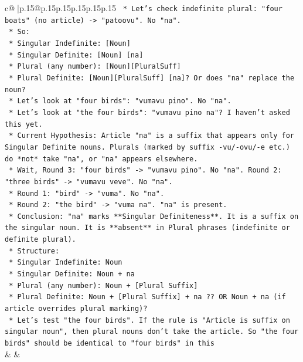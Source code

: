 \documentclass{article}
\begin{document}
{\begin{supertabular}{c@{$\;$}|p{.15\linewidth}@{}p{.15\linewidth}p{.15\linewidth}p{.15\linewidth}p{.15\linewidth}p{.15\linewidth}}
{{{\texttt{        *   Let's check indefinite plural: "four boats" (no article) {-}> "patoovu". No "na".} \\
\texttt{        *   So:} \\
\texttt{            *   Singular Indefinite: {[}Noun{]}} \\
\texttt{            *   Singular Definite: {[}Noun{]} {[}na{]}} \\
\texttt{            *   Plural (any number): {[}Noun{]}{[}PluralSuff{]}} \\
\texttt{            *   Plural Definite: {[}Noun{]}{[}PluralSuff{]} {[}na{]}? Or does "na" replace the noun?} \\
\texttt{            *   Let's look at "four birds": "vumavu pino". No "na".} \\
\texttt{            *   Let's look at "the four birds": "vumavu pino na"? I haven't asked this yet.} \\
\texttt{            *   Current Hypothesis: Article "na" is a suffix that appears only for Singular Definite nouns. Plurals (marked by suffix {-}vu/{-}ovu/{-}e etc.) do *not* take "na", or "na" appears elsewhere.} \\
\texttt{            *   Wait, Round 3: "four birds" {-}> "vumavu pino". No "na". Round 2: "three birds" {-}> "vumavu veve". No "na".} \\
\texttt{            *   Round 1: "bird" {-}> "vuma". No "na".} \\
\texttt{            *   Round 2: "the bird" {-}> "vuma na". "na" is present.} \\
\texttt{            *   Conclusion: "na" marks **Singular Definiteness**. It is a suffix on the singular noun. It is **absent** in Plural phrases (indefinite or definite plural).} \\
\texttt{            *   Structure:} \\
\texttt{                *   Singular Indefinite: Noun} \\
\texttt{                *   Singular Definite: Noun + na} \\
\texttt{                *   Plural (any number): Noun + {[}Plural Suffix{]}} \\
\texttt{                *   Plural Definite: Noun + {[}Plural Suffix{]} + na ?? OR Noun + na (if article overrides plural marking)?} \\
\texttt{                *   Let's test "the four birds". If the rule is "Article is suffix on singular noun", then plural nouns don't take the article. So "the four birds" should be identical to "four birds" in this} \\
            }
        }
    }
    & & \\ \\


\end{supertabular}}
\end{document}
